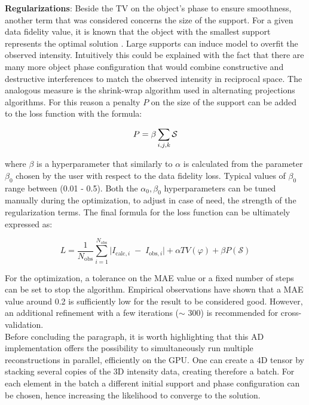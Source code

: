 \textbf{Regularizations}:
Beside the TV on the object's phase to ensure smoothness, another term that was considered concerns the size of the support. 
For a given data fidelity value, it is known that the object with the smallest support represents the optimal solution 
\cite{favre-nicolin_free_2020}. Large supports can induce model to overfit the observed intensity. Intuitively this 
could be explained with the fact that there are many more object phase configuration 
that would combine constructive and destructive interferences to match the observed intensity in reciprocal space. 
The analogous measure is the shrink-wrap algorithm \cite{Marchesini_shrinkwrap} used in alternating projections algorithms.  
For this reason a penalty $P$ on the size of the support can be added to the loss function with the formula: 

\begin{equation}
    \centering
    P = \beta  \sum_{i,j,k} \mathcal S
\end{equation}

where $\beta$ is a hyperparameter that similarly to $\alpha$ is calculated from the parameter $\beta_0$ chosen by the 
user with respect to the data fidelity loss. Typical values of $\beta_0$ range between (0.01 - 0.5).
Both the $\alpha_0, \beta_0$ hyperparameters can be tuned manually during the optimization, to adjust in case of need, the strength of 
the regularization terms.
The final formula for the loss function can be ultimately expressed as: 

\begin{equation}
       L = \frac{1}{N_{\mathrm{obs}}}
       \sum_{i=1}^{N_{\mathrm{obs}}}
       \bigl\lvert I_{\mathrm{calc},i} \;-\; I_{\mathrm{obs},i}\bigr\rvert  
        + \alpha TV(\varphi)
        + \beta  P(\mathcal S)
\end{equation}

For the optimization, a tolerance on the MAE value or a fixed number of steps can be set to stop the algorithm. Empirical 
observations have shown that a MAE value around 0.2 is sufficiently low for the result to be considered good. However, 
an additional refinement with a few iterations ($\sim$ 300) is recommended for cross-validation.  \\

Before concluding the paragraph, it is worth highlighting that this AD implementation offers the possibility to simultaneously 
run multiple reconstructions in parallel, efficiently on the GPU. One can create a 4D tensor by stacking several copies of the 3D 
intensity data, creating therefore a batch. For each element in the batch a different initial support and phase configuration 
can be chosen, hence increasing the likelihood to converge to the solution. 

